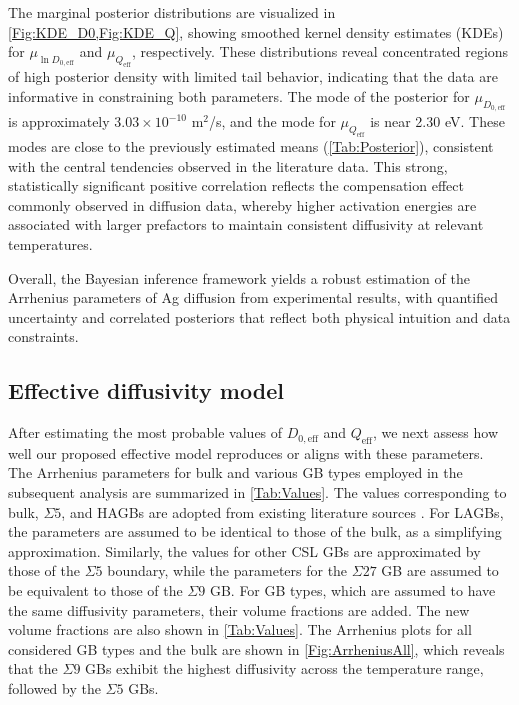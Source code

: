 \documentclass[%
preprint,
amsmath,amssymb,
aps,
]{revtex4-2}
\newcommand{\?}{\stackrel{?}{=}}
\begin{document}
The marginal posterior distributions are visualized in \cref{Fig:KDE_D0,Fig:KDE_Q}, showing smoothed kernel density estimates (KDEs) for $\mu_{\ln D_{0,\text{eff}}}$ and $\mu_{Q_\text{eff}}$, respectively. These distributions reveal concentrated regions of high posterior density with limited tail behavior, indicating that the data are informative in constraining both parameters. The mode of the posterior for $\mu_{D_{0,\text{eff}}}$ is approximately $3.03 \times 10^{-10}$ m$^2$/s, and the mode for $\mu_{Q_\text{eff}}$ is near 2.30 eV. These modes are close to the previously estimated means (\cref{Tab:Posterior}), consistent with the central tendencies observed in the literature data. This strong, statistically significant positive correlation reflects the compensation effect \cite{Watanabe1990} commonly observed in diffusion data, whereby higher activation energies are associated with larger prefactors to maintain consistent diffusivity at relevant temperatures.

Overall, the Bayesian inference framework yields a robust estimation of the Arrhenius parameters of Ag diffusion from experimental results, with quantified uncertainty and correlated posteriors that reflect both physical intuition and data constraints.


\subsection{Effective diffusivity model}

After estimating the most probable values of $D_{0,\text{eff}}$ and $Q_\text{eff}$, we next assess how well our proposed effective model reproduces or aligns with these parameters. The Arrhenius parameters for bulk and various GB types employed in the subsequent analysis are summarized in \cref{Tab:Values}. The values corresponding to bulk, $\Sigma 5$, and HAGBs are adopted from existing literature sources \cite{Jiang2021,Aagesen2022}. For LAGBs, the parameters are assumed to be identical to those of the bulk, as a simplifying approximation. Similarly, the values for other CSL GBs are approximated by those of the $\Sigma 5$ boundary, while the parameters for the $\Sigma 27$ GB are assumed to be equivalent to those of the $\Sigma 9$ GB. For GB types, which are assumed to have the same diffusivity parameters, their volume fractions are added. The new volume fractions are also shown in \cref{Tab:Values}. The Arrhenius plots for all considered GB types and the bulk are shown in \cref{Fig:ArrheniusAll}, which reveals that the $\Sigma 9$ GBs exhibit the highest diffusivity across the temperature range, followed by the $\Sigma 5$ GBs.
\end{document}
